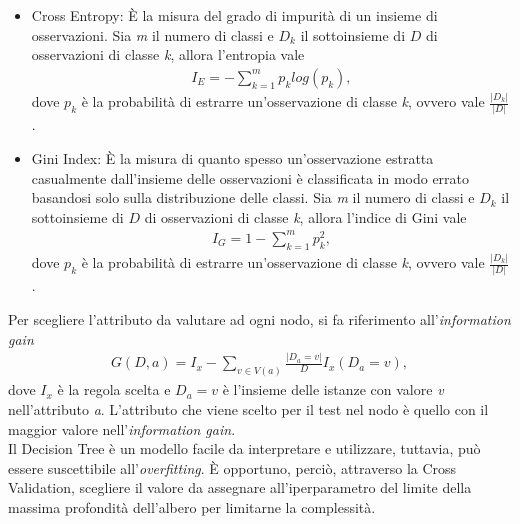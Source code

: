 \begin{itemize}
	\item Cross Entropy: È la misura del grado di impurità di un insieme di osservazioni. Sia \emph{m} il numero di classi e $D_k$ il sottoinsieme di $D$ di osservazioni di classe \emph{k}, allora l'entropia vale
	\begin{align*}
		I_E =	- \sum_{k=1}^{m} p_k log(p_k),
	\end{align*} 
	dove $p_k$ è la probabilità di estrarre un'osservazione di classe \emph{k}, ovvero vale $\frac{|D_k|}{|D|}$.
	\item Gini Index: È la misura di quanto spesso un'osservazione estratta casualmente dall'insieme delle osservazioni è classificata in modo errato basandosi solo sulla distribuzione delle classi. Sia \emph{m} il numero di classi e $D_k$ il sottoinsieme di $D$ di osservazioni di classe \emph{k}, allora l'indice di Gini vale
	\begin{align*}
		I_G = 1 - \sum_{k=1}^{m} p_{k}^2,
	\end{align*} 
	dove $p_k$ è la probabilità di estrarre un'osservazione di classe \emph{k}, ovvero vale $\frac{|D_k|}{|D|}$.
\end{itemize}
Per scegliere l'attributo da valutare ad ogni nodo, si fa riferimento all'\emph{information gain}
\begin{align*}
	G(D,a) = I_x - \sum_{v\in V(a)} \frac{|D_a = v|}{D}I_x(D_a=v),
\end{align*} 
dove $I_x$ è la regola scelta e $D_a=v$ è l'insieme delle istanze con valore \emph{v} nell'attributo \emph{a}.
L'attributo che viene scelto per il test nel nodo è quello con il maggior valore nell'\emph{information gain}.\\
Il Decision Tree è un modello facile da interpretare e utilizzare, tuttavia, può essere suscettibile all'\emph{overfitting}. È opportuno, perciò, attraverso la Cross Validation, scegliere il valore da assegnare all'iperparametro del limite della massima profondità dell'albero per limitarne la complessità.
